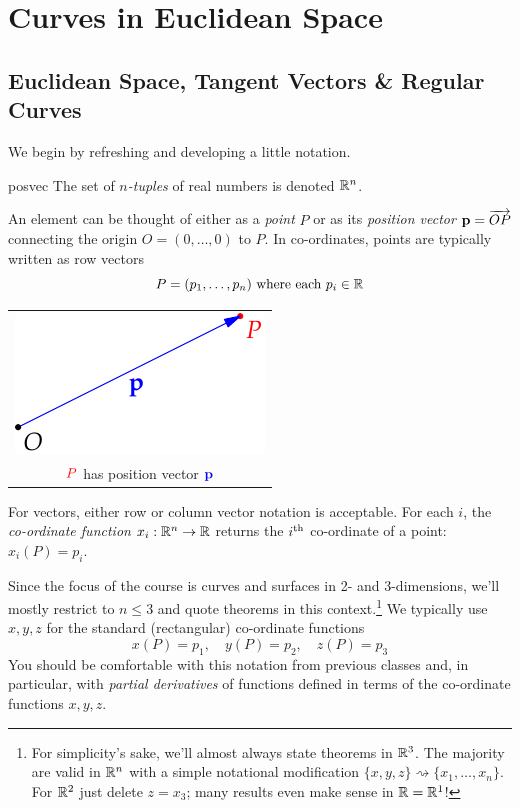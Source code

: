 \section{Curves in Euclidean Space}

\subsection{Euclidean Space, Tangent Vectors \& Regular Curves}\label{sec:euclid}

We begin by refreshing and developing a little notation.

\begin{defn}{}{posvec}
	The set of \emph{$n$-tuples} of real numbers is denoted $\mathbb{R}^n$.\par
	\begin{minipage}[t]{0.7\linewidth}\vspace{-5pt}
		An element can be thought of either as a \emph{point} $P$ or as its \emph{position vector} ${\mathbf{p}}=\overrightarrow{OP}$ connecting the origin $O=(0,\ldots,0)$ to $P$.\smallbreak
		In co-ordinates, points are typically written as row vectors
		\[P=({p}_1,\ldots,{p}_{n})\text{ where each }p_i\in\mathbb{R}\]
	\end{minipage}
	\hfill
	\begin{minipage}[t]{0.29\linewidth}\vspace{-15pt}
		\flushright
		\begin{tabular}{c}
			\includegraphics{euclid-posvec}\\
			$\textcolor{red}{P}$ has position vector $\textcolor{blue}{{\mathbf{p}}}$
		\end{tabular}
	\end{minipage}\smallbreak
	For vectors, either row or column vector notation is acceptable.\smallbreak
	For each $i$, the \emph{co-ordinate function} $x_i:\mathbb{R}^n\to\mathbb{R}$ returns the $i\textsuperscript{th}$ co-ordinate of a point: $x_i(P)=p_i$.
\end{defn}


Since the focus of the course is curves and surfaces in 2- and 3-dimensions, we'll mostly restrict to $n\le 3$ and quote theorems in this context.\footnote{For simplicity's sake, we'll almost always state theorems in $\mathbb{R}^3$. The majority are valid in $\mathbb{R}^n$ with a simple notational modification $\{x,y,z\}\rightsquigarrow \{x_1,\ldots,x_n\}$. For $\mathbb{R}^2$ just delete $z=x_3$; many results even make sense in $\mathbb{R}=\mathbb{R}^1$!} We typically use $x,y,z$ for the standard (rectangular) co-ordinate functions
\[
	x(P)=p_1,\quad y(P)=p_2,\quad z(P)=p_3
\]
You should be comfortable with this notation from previous classes and, in particular, with \emph{partial derivatives} of functions defined in terms of the co-ordinate functions $x,y,z$.

